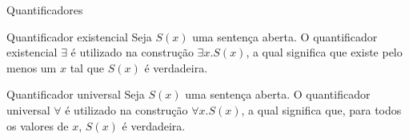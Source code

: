 \begin{frame}[fragile]{Quantificadores}

    \begin{block}{Quantificador existencial}
        Seja $S(x)$ uma sentença aberta. O quantificador existencial $\exists$ é utilizado na construção $\exists x.S(x)$, a qual
        significa que existe pelo menos um $x$ tal que $S(x)$ é verdadeira.
    \end{block}

    \vspace{0.3in}

    \begin{block}{Quantificador universal}
        Seja $S(x)$ uma sentença aberta. O quantificador universal $\forall$ é utilizado na construção $\forall x.S(x)$, a qual
        significa que, para todos os valores de $x$, $S(x)$ é verdadeira.
    \end{block}
\end{frame}
